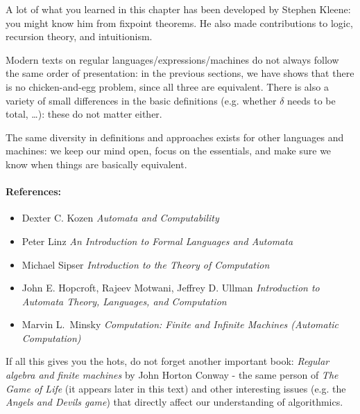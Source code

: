 A lot of what you learned in this chapter has been developed by
Stephen Kleene: you might know him from fixpoint theorems. He also made contributions to logic, recursion theory, and intuitionism.

Modern texts on regular languages/expressions/machines do not always
follow the same order of presentation: in the previous sections, we
have shows that there is no chicken-and-egg problem, since all three
are equivalent. There is also a variety of small differences in the
basic definitions (e.g. whether $\delta$ needs to be total, 
\ldots): these
do not matter either.

The same diversity in definitions and approaches exists for other
languages and machines: we keep our mind open, focus on the
essentials, and make sure we know when things are basically
equivalent.

\paragraph{References:}
\begin{itemize}
\item
Dexter C. Kozen  {\em Automata and Computability}

\item
Peter Linz {\em An Introduction to Formal Languages and Automata}

\item
Michael Sipser {\em Introduction to the Theory of Computation}

\item
John E. Hopcroft, Rajeev Motwani, Jeffrey D. Ullman
{\em Introduction to Automata Theory, Languages, and Computation}

\item
Marvin L.\ Minsky {\em Computation: Finite and Infinite Machines
(Automatic Computation)}
\end{itemize}

If all this gives you the hots, do not forget another important
book: {\em Regular algebra and finite machines}
by John Horton Conway - the same person of {\em The Game of Life} (it
appears later in this text) and other interesting issues (e.g. the
{\em Angels and Devils game}) that directly affect our understanding
of algorithmics.

